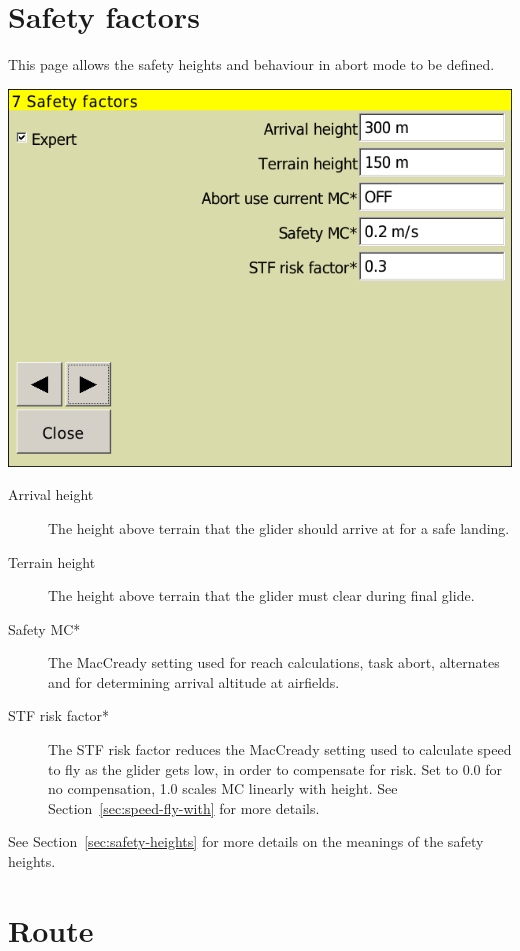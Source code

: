 \section{Safety factors}

This page allows the safety heights and behaviour in abort mode to be defined.

\begin{center}
\includegraphics[angle=0,width=0.8\linewidth,keepaspectratio='true']{figures/config-safety.png}
\end{center}

\begin{description}
\item[Arrival height]  The height above terrain that the glider
  should arrive at for a safe landing.
\item[Terrain height] \label{conf:safetyterrain} The height above terrain that the glider must
  clear during final glide.
\item[Safety MC*]  The MacCready setting used for reach calculations, task abort, alternates and
  for determining arrival altitude at airfields. 
\item[STF risk factor*] 
  The STF risk factor reduces the MacCready setting used to calculate
  speed to fly as the glider gets low, in order to compensate for
  risk.  Set to 0.0 for no compensation, 1.0 scales MC linearly with
  height.  See Section~\ref{sec:speed-fly-with} for more details.
\end{description}
See Section~\ref{sec:safety-heights} for more details on the meanings
of the safety heights.

\section{Route}

